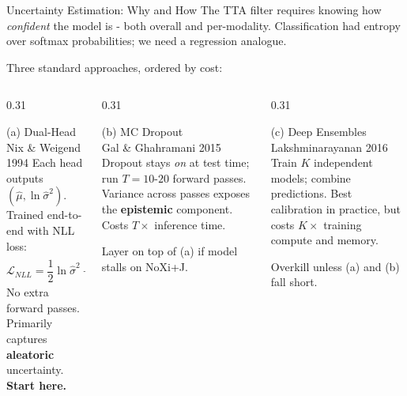 \documentclass[aspectratio=169]{beamer}
\newcommand{\hl}[1]{\textcolor{coolpurple}{\textbf{#1}}}
\begin{document}
	\begin{frame}{Uncertainty Estimation: Why and How}
		The TTA filter requires knowing how \textit{confident} the model is - both overall and per-modality. Classification had entropy over softmax probabilities; we need a regression analogue.
		\vspace{0.4em}
		
		Three standard approaches, ordered by cost:
		\vspace{0.3em}
		\begin{columns}
			\begin{column}{0.31\textwidth}
				\begin{block}{(a) Dual-Head \\ \small Nix \& Weigend 1994}
					\small Each head outputs $(\hat{\mu}, \ln \hat{\sigma}^2)$. Trained end-to-end with NLL loss:
					$$\mathcal{L}_{NLL} = \frac{1}{2} \ln \hat{\sigma}^2 + \frac{(y - \hat{\mu})^2}{2 \hat{\sigma}^2}$$
					No extra forward passes. Primarily captures \textbf{aleatoric} uncertainty. \hl{Start here.}
				\end{block}
			\end{column}
			\begin{column}{0.31\textwidth}
				\begin{block}{(b) MC Dropout \\ \small Gal \& Ghahramani 2015}
					\small Dropout stays \textit{on} at test time; run $T = 10$-$20$ forward passes. Variance across passes exposes the \hl{epistemic} component. Costs $T \times$ inference time.
					\vspace{0.4em}
					
					Layer on top of (a) if model stalls on NoXi+J.
				\end{block}
			\end{column}
			\begin{column}{0.31\textwidth}
				\begin{block}{(c) Deep Ensembles \\ \small Lakshminarayanan 2016}
					\small Train $K$ independent models; combine predictions. Best calibration in practice, but costs $K \times$ training compute and memory.
					\vspace{0.4em}
					
					Overkill unless (a) and (b) fall short.
				\end{block}
			\end{column}
		\end{columns}
	\end{frame}
	
\end{document}
